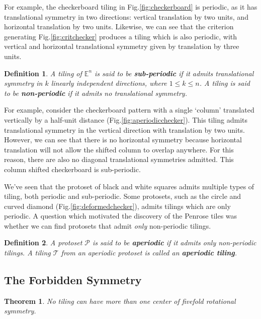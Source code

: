 \documentclass[]{article}
\newtheorem{mydef}{Definition}
\newtheorem{mythm}{Theorem}
\begin{document}
For example, the checkerboard tiling in Fig.\ref{fig:checkerboard} is periodic, as it has translational symmetry in two directions: vertical translation by two units, and horizontal translation by two units. Likewise, we can see that the criterion generating Fig.\ref{fig:critchecker} produces a tiling which is also periodic, with vertical and horizontal translational symmetry given by translation by three units. 

\begin{mydef}
A tiling of  $\mathbb{E}^n$ is said to be \textbf{sub-periodic} if it admits translational symmetry in $k$ linearly independent directions, where $1\leq k\leq n$. A tiling is said to be \textbf{non-periodic} if it admits no translational symmetry. 
\end{mydef}

For example, consider the checkerboard pattern with a single `column' translated vertically by a half-unit distance (Fig.\ref{fig:aperiodicchecker}). This tiling admits translational symmetry in the vertical direction with translation by two units. However, we can see that there is no horizontal symmetry because horizontal translation will not allow the shifted column to overlap anywhere. For this reason, there are also no diagonal translational symmetries admitted. This column shifted checkerboard is sub-periodic. 

We've seen that the protoset of black and white squares admits multiple types of tiling, both periodic and sub-periodic. Some protosets, such as the circle and curved diamond (Fig.\ref{fig:deformedchecker}), admits tilings which are only periodic. A question which motivated the discovery of the Penrose tiles was whether we can find protosets that admit \textit{only} non-periodic tilings.

\begin{mydef}
A protoset $\mathcal{P}$ is said to be \textbf{aperiodic} if it admits only non-periodic tilings. A tiling $\mathcal{T}$ from an aperiodic protoset is called an \textbf{aperiodic tiling}. 
\end{mydef}


\subsection{The Forbidden Symmetry}


\begin{mythm}
No tiling can have more than one center of fivefold rotational symmetry.
\label{symthm}
\end{mythm}
\end{document}
